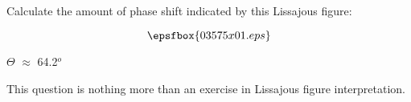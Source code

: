 

Calculate the amount of phase shift indicated by this Lissajous figure:

$$\epsfbox{03575x01.eps}$$







$\Theta$ $\approx$ 64.2$^{o}$







This question is nothing more than an exercise in Lissajous figure interpretation.




